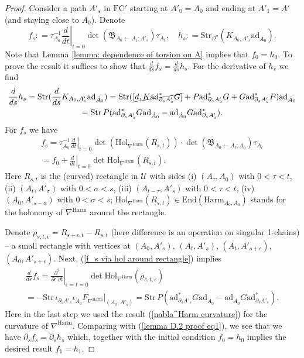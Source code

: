 \documentclass[11pt,a4paper]{amsart}
\theoremstyle{plain} %
\theoremstyle{definition}
\theoremstyle{remark}
\newcommand{\mr}{\mathrm}
\newcommand{\bt}{\bullet}
\newcommand{\mc}{\mathcal}
\newcommand{\ad}{\mathrm{ad}}
\newcommand{\FC}{\mathrm{FC}}
\newcommand{\la}{\leftarrow}
\newcommand{\BB}{\mathfrak{B}}
\begin{document}
\begin{proof}
    Consider a path $A'_s$ in $\FC'$ starting at $A'_0=A_0$ and ending at $A'_1=A'$ (and staying close to $A_0$). Denote
    $$ f_s\colon = \tau_{A_0}^{-1}\left. \frac{d}{dt}\right|_{t=0} \det(\BB_{A_0\la A_t;A'_s})\tau_{A_t},\quad
    h_s\colon= \mr{Str}_{\Omega^\bt} (K_{A_0,A'_s} \ad_{\dot{A}_0}).
    $$
Note that Lemma \ref{lemma: dependence of torsion on A} implies that $f_0=h_0$. To prove the result it suffices to show that $\frac{d}{ds} f_s=\frac{d}{ds} h_s$.
For the derivative of $h_s$ we find
\begin{multline}\label{lemma D.2 proof eq1}
    \frac{d}{ds} h_s= \mr{Str}(\frac{d}{ds}K_{A_0,A'_s} \ad_{\dot{A}_0})=
    \mr{Str}(\cancel{[d,K\ad^*_{\partial_s A'_s} G]}+P\ad^*_{\partial_s A'_s}G+G\ad^*_{\partial_s A'_s} P)\ad_{\dot{A}_0}\\
    =\mr{Str}\,P(\ad^*_{\partial_s A'_s}G \ad_{\dot{A}_0}-\ad_{\dot{A}_0} G\ad^*_{\partial_s A'_s}).
\end{multline}
For $f_s$ we have
\begin{multline}\label{f_s via hol around rectangle}
    f_s=\tau_{A_0}^{-1}\left.\frac{d}{dt}\right|_{t=0} \det (\mr{Hol}_{\nabla^\mr{Harm}}(R_{s,t}))\cdot \det (\BB_{A_0\la A_t;A_0}) \tau_{A_t} \\= f_0+\left.\frac{d}{dt}\right|_{t=0}\det \mr{Hol}_{\nabla^\mr{Harm}}(R_{s,t}).
\end{multline}
Here $R_{s,t}$ is the (curved) rectangle in $\mc{U}$ with sides (i) $(A_\tau,A_0)$ with $0<\tau<t$, (ii) $(A_t,A'_\sigma)$ with $0<\sigma <s$, (iii) $(A_{t-\tau},A'_s)$ with $0<\tau<t$, (iv) $(A_0,A'_{s-\sigma})$ with $0<\sigma < s$; $\mr{Hol}_{\nabla^\mr{Harm}}(R_{s,t})\in \mr{End}(\mr{Harm}_{A_0,A_0})$ stands for the holonomy of $\nabla^\mr{Harm}$ around the rectangle. 

Denote $\rho_{s,t,\epsilon}=R_{s+\epsilon,t}-R_{s,t}$ (here difference is an operation on singular 1-chains) -- a small rectangle with vertices at $(A_0,A'_s)$, $(A_t,A'_s)$, $(A_t,A'_{s+\epsilon})$, $(A_0,A'_{s+\epsilon})$. 
Next, (\ref{f_s via hol around rectangle}) implies
\begin{multline}\label{lemma D.2 proof eq2}
    \frac{d}{ds}f_s= \left.\frac{\partial^2}{\partial \epsilon\, \partial t}\right|_{\epsilon=t=0} \det \mr{Hol}_{\nabla^\mr{Harm}}(\rho_{s,t,\epsilon})\\
    =-\mr{Str}\, \iota_{\partial_s A'_s}\iota_{\dot{A}_0}F_{\nabla^\mr{Harm}}\Big|_{(A_0,A'_s)} =\mr{Str}\,P (\ad^*_{\partial_s A'_s} G \ad_{\dot{A}_0}-\ad_{\dot{A}_0} G \ad^*_{\partial_s A'_s}).
\end{multline}
Here in the last step we used the result (\ref{nabla^Harm curvature}) for the curvature of $\nabla^\mr{Harm}$. Comparing with (\ref{lemma D.2 proof eq1}), we see that we have $\partial_s f_s=\partial_s h_s$ which, together with the initial condition $f_0=h_0$ implies the desired result $f_1=h_1$. 
\end{proof}
\end{document}
